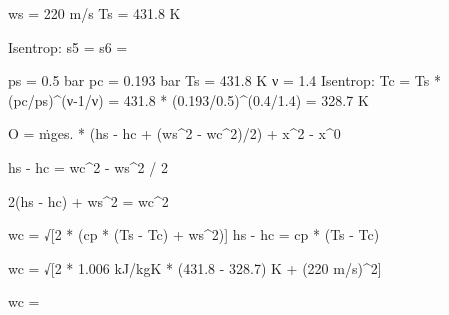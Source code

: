 ws = 220 m/s  
Ts = 431.8 K  

Isentrop: s5 = s6 =

ps = 0.5 bar  
pc = 0.193 bar  
Ts = 431.8 K  
ν = 1.4  
Isentrop: Tc = Ts * (pc/ps)^(ν-1/ν) = 431.8 * (0.193/0.5)^(0.4/1.4) = 328.7 K  

O = ṁges. * (hs - hc + (ws^2 - wc^2)/2) + x^2 - x^0  

hs - hc = wc^2 - ws^2 / 2  

2(hs - hc) + ws^2 = wc^2  

wc = √[2 * (cp * (Ts - Tc) + ws^2)]  
hs - hc = cp * (Ts - Tc)  

wc = √[2 * 1.006 kJ/kgK * (431.8 - 328.7) K + (220 m/s)^2]  

wc =